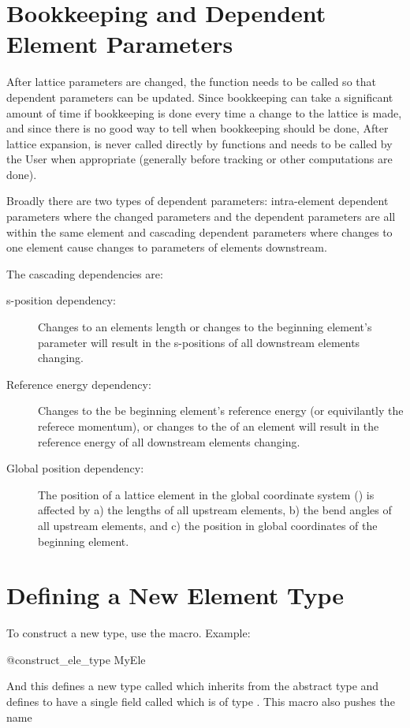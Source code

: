 \section{Bookkeeping and Dependent Element Parameters}
\label{s:param.depend}

After lattice parameters are changed, the function  needs to be called
so that dependent parameters can be updated. 
Since bookkeeping can take a significant amount of time if bookkeeping is done every time
a change to the lattice is made, and since there is no good way to tell when bookkeeping should
be done, After lattice expansion,  is never called directly by \accellat 
functions and needs to be called by the User when appropriate (generally before tracking or
other computations are done).

Broadly there are two types of dependent parameters: intra-element dependent parameters where
the changed parameters and the dependent parameters are all within the same element and
cascading dependent parameters where changes to one element cause changes to parameters of 
elements downstream.

The cascading dependencies are:
\begin{description}
%
\item [s-position dependency:]
Changes to an elements length  or changes to the beginning element's  parameter will
result in the s-positions of all downstream elements changing.
%
\item [Reference energy dependency:] Changes to the be beginning element's reference energy (or
equivilantly the referece momentum), or changes to the  of an  element
will result in the reference energy of all downstream elements changing.
%
\item[Global position dependency:]
The position of a lattice element in the global coordinate system () is affected
by a) the lengths of all upstream elements, b) the bend angles of all upstream elements, and c)
the position in global coordinates of the beginning element.
\end{description}


\section{Defining a New Element Type}
\label{s:ele.type}

To construct a new type, use the  macro. Example:
\begin{example}
  @construct_ele_type MyEle
\end{example}
And this defines a new type called  which inherits from the abstract type  and
defines  to have a single field called  which is of type .
This macro also pushes the name
